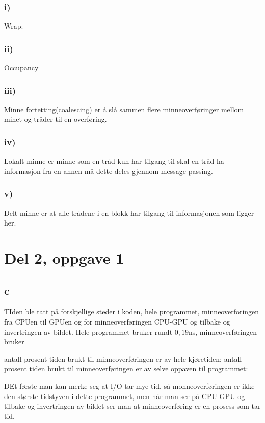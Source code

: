 \documentclass[12pt, a4paper]{article} %
\begin{document}
\subsubsection{i)}
Wrap: 
\subsubsection{ii)}
Occupancy
\subsubsection{iii)}
Minne fortetting(coalescing) er å slå sammen flere minneoverføringer mellom minet og tråder til en overføring.
\subsubsection{iv)}
Lokalt minne er minne som en tråd kun har tilgang til skal en tråd ha informasjon fra en annen må dette deles gjennom message passing.
\subsubsection*{v)}
Delt minne er at alle trådene i en blokk har tilgang til informasjonen som ligger her.

\section*{Del 2, oppgave 1}
\subsection*{c}
TIden ble tatt på forskjellige steder i koden, hele programmet, minneoverforingen fra CPUen til GPUen og for minneoverføringen CPU-GPU og tilbake og invertringen av bildet. Hele programmet bruker rundt $0,19$ns, minneoverføringen bruker 

antall prosent tiden brukt til minneoverføringen er av hele kjøretiden: 
antall prosent tiden brukt til minneoverføringen er av selve oppaven til programmet:

DEt første man kan merke seg at I/O tar mye tid, så monneoverføringen er ikke den største tidstyven i dette programmet, men når man ser på CPU-GPU og tilbake og invertringen av bildet ser man at minneoverføring er en prosess som tar tid.
\end{document}
